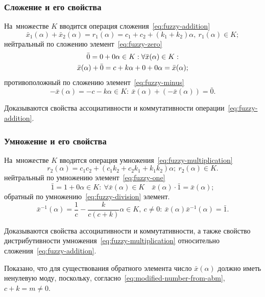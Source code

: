 \documentclass[12pt]{beamer}
\begin{document}
\begin{frame}
  \frametitle{Сложение и его свойства}
  На~множестве $K$ вводится операция сложения~\eqref{eq:fuzzy-addition}
  \begin{equation}
    \label{eq:fuzzy-addition}
    \bar{x}_1\left(\alpha \right)+\bar{x}_2\left(\alpha \right)=r_1\left( \alpha  \right)=c_1+c_2+\left(k_1+k_2 \right)\alpha,\ r_1 \left( \alpha  \right)\in K;
  \end{equation}
  нейтральный по сложению элемент~\eqref{eq:fuzzy-zero}
  \begin{gather}
    \label{eq:fuzzy-zero}
    \bar{0}=0+0\alpha \in K: \forall \bar{x}(\alpha )\in K: \notag \\ 
    \bar{x}(\alpha )+\bar{0}=c+k\alpha +0+0\alpha =\bar{x}(\alpha );
  \end{gather}
  противоположный по сложению элемент~\eqref{eq:fuzzy-minus} 
  \begin{equation}
    \label{eq:fuzzy-minus}
    -\bar{x}\left(\alpha \right)=-c-k\alpha \in K:\ \bar{x}\left( \alpha  \right)+\left( -\bar{x}\left( \alpha  \right) \right)=\bar{0}. 
  \end{equation}

  Доказываются свойства ассоциативности и коммутативности операции~\eqref{eq:fuzzy-addition}.
\end{frame}


\begin{frame}
  \frametitle{Умножение и его свойства}
  На~множестве $K$ вводится операция умножения~\eqref{eq:fuzzy-multiplication}
  \begin{equation}
  \label{eq:fuzzy-multiplication}
    r_2\left( \alpha \right)=c_1 c_2+\left(c_1 k_2+ c_2 k_1 +k_1 k_2 \right)\alpha;\ r_2\left( \alpha  \right)\in K.
  \end{equation}
  нейтральный по умножению элемент~\eqref{eq:fuzzy-one} 
  \begin{equation}
    \label{eq:fuzzy-one}
    \bar{1}=1+0\alpha \in K:\ \forall \bar{x}\left( \alpha  \right)\in K\quad \bar{x}\left( \alpha  \right)\cdot \bar{1}=\bar{x}\left( \alpha  \right);
  \end{equation}
  обратный по умножению~\eqref{eq:fuzzy-division} элемент. 
  \begin{equation}
    \label{eq:fuzzy-division}
    \bar{x}^{-1}(\alpha )=\frac{1}{c}-\frac{k}{c\left(c+k\right)}\alpha \in K,\ c\ne 0:\ \bar{x}\left(\alpha \right){{\bar{x}}^{-1}}\left( \alpha  \right)=\bar{1}.
  \end{equation}
  
  Доказываются свойства ассоциативности и коммутативности, а также свойство дистрибутивности умножения~\eqref{eq:fuzzy-multiplication} относительно сложения~\eqref{eq:fuzzy-addition}. 
  
  Показано, что для существования обратного элемента число $\bar{x}\left( \alpha  \right)$ должно иметь ненулевую моду, поскольку, согласно~\eqref{eq:modified-number-from-abm}, $c+k=m\ne 0$.
\end{frame}
\end{document}
